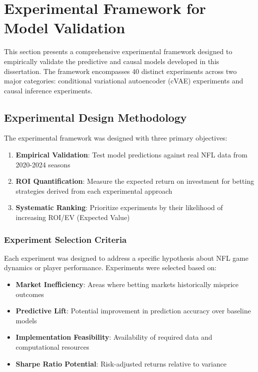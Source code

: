 \section{Experimental Framework for Model Validation}
\label{sec:experiment_framework}

This section presents a comprehensive experimental framework designed to empirically validate the predictive and causal models developed in this dissertation. The framework encompasses 40 distinct experiments across two major categories: conditional variational autoencoder (cVAE) experiments and causal inference experiments.

\subsection{Experimental Design Methodology}

The experimental framework was designed with three primary objectives:
\begin{enumerate}
    \item \textbf{Empirical Validation}: Test model predictions against real NFL data from 2020-2024 seasons
    \item \textbf{ROI Quantification}: Measure the expected return on investment for betting strategies derived from each experimental approach
    \item \textbf{Systematic Ranking}: Prioritize experiments by their likelihood of increasing ROI/EV (Expected Value)
\end{enumerate}

\subsubsection{Experiment Selection Criteria}

Each experiment was designed to address a specific hypothesis about NFL game dynamics or player performance. Experiments were selected based on:

\begin{itemize}
    \item \textbf{Market Inefficiency}: Areas where betting markets historically misprice outcomes
    \item \textbf{Predictive Lift}: Potential improvement in prediction accuracy over baseline models
    \item \textbf{Implementation Feasibility}: Availability of required data and computational resources
    \item \textbf{Sharpe Ratio Potential}: Risk-adjusted returns relative to variance
\end{itemize}

